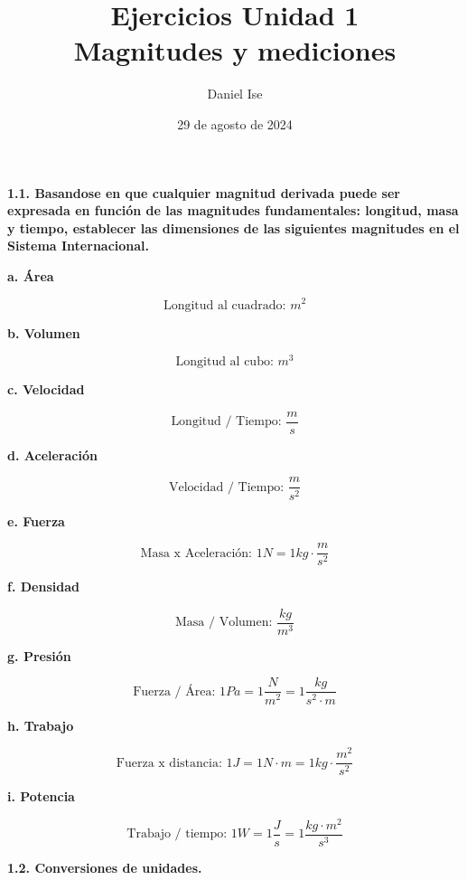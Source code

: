 \documentclass{article}
\title{Ejercicios Unidad 1\\Magnitudes y mediciones}
\author{Daniel Ise}
\date{29 de agosto de 2024}
\begin{document}
\maketitle

\textbf{1.1. Basandose en que cualquier magnitud derivada puede ser expresada en
    función de las magnitudes fundamentales: longitud, masa y tiempo, establecer las
    dimensiones de las siguientes magnitudes en el Sistema Internacional.}

\textbf{a. Área}

\[\text{Longitud al cuadrado: }m^{2}\]

\textbf{b. Volumen}

\[\text{Longitud al cubo: }m^{3}\]

\textbf{c. Velocidad}

\[\text{Longitud / Tiempo: }\frac{m}{s}\]

\textbf{d. Aceleración}

\[\text{Velocidad / Tiempo: } \frac{m}{s^{2}}\]

\textbf{e. Fuerza}

\[\text{Masa x Aceleración: } 1 N = 1 kg \cdot \frac{m}{s^{2}}\]

\textbf{f. Densidad}

\[\text{Masa / Volumen: }\frac{kg}{m^{3}}\]

\textbf{g. Presión}

\[\text{Fuerza / Área: }1 Pa = 1 \frac{N}{m^{2}} = 1 \frac{kg}{s^{2} \cdot m}\]

\textbf{h. Trabajo}

\[\text{Fuerza x distancia: }1 J = 1 N \cdot m = 1 kg \cdot \frac{m^{2}}{s^{2}}\]

\textbf{i. Potencia}

\[\text{Trabajo / tiempo: }1 W = 1 \frac{J}{s} = 1 \frac{kg \cdot m^{2}}{s^{3}}\]

\hfill

\textbf{1.2. Conversiones de unidades.}
\end{document}

